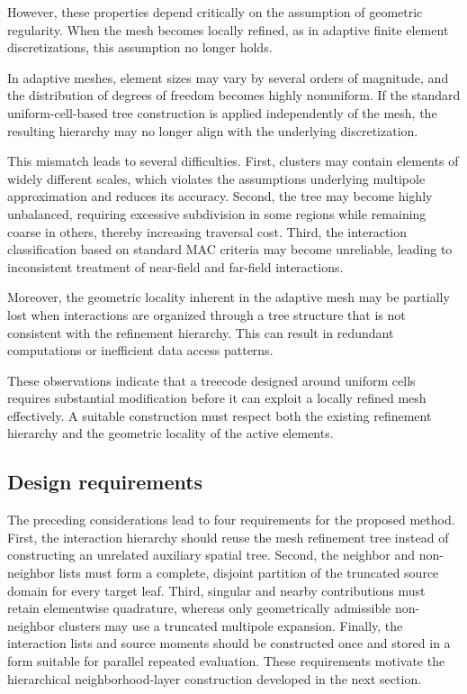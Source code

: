 \documentclass[a4paper,10pt]{article}
\begin{document}
However, these properties depend critically on the assumption
of geometric regularity.
When the mesh becomes locally refined, as in adaptive finite
element discretizations, this assumption no longer holds.

In adaptive meshes, element sizes may vary by several orders
of magnitude, and the distribution of degrees of freedom
becomes highly nonuniform.
If the standard uniform-cell-based tree construction is applied
independently of the mesh, the resulting hierarchy may no longer
align with the underlying discretization.

This mismatch leads to several difficulties.
First, clusters may contain elements of widely different scales,
which violates the assumptions underlying multipole approximation
and reduces its accuracy.
Second, the tree may become highly unbalanced, requiring excessive
subdivision in some regions while remaining coarse in others,
thereby increasing traversal cost.
Third, the interaction classification based on standard MAC
criteria may become unreliable, leading to inconsistent treatment
of near-field and far-field interactions.

Moreover, the geometric locality inherent in the adaptive mesh
may be partially lost when interactions are organized through
a tree structure that is not consistent with the refinement hierarchy.
This can result in redundant computations or inefficient data access patterns.

These observations indicate that a treecode designed around uniform cells
requires substantial modification before it can exploit a locally refined
mesh effectively.  A suitable construction must respect both the existing
refinement hierarchy and the geometric locality of the active elements.

\subsection{Design requirements}

The preceding considerations lead to four requirements for the proposed
method.  First, the interaction hierarchy should reuse the mesh refinement
tree instead of constructing an unrelated auxiliary spatial tree.  Second,
the neighbor and non-neighbor lists must form a complete, disjoint
partition of the truncated source domain for every target leaf.  Third,
singular and nearby contributions must retain elementwise quadrature,
whereas only geometrically admissible non-neighbor clusters may use a
truncated multipole expansion.  Finally, the interaction lists and source
moments should be constructed once and stored in a form suitable for
parallel repeated evaluation.  These requirements motivate the
hierarchical neighborhood-layer construction developed in the next
section.
\end{document}
